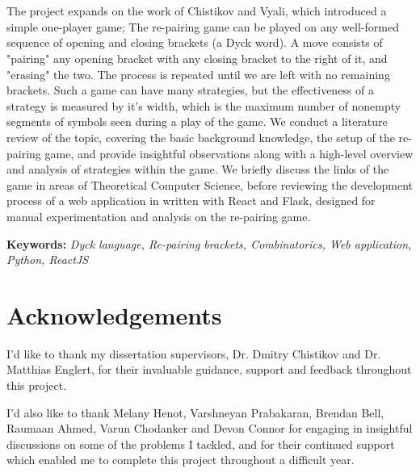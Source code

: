 \clearpage
\thispagestyle{empty}
\nointerlineskip
\vspace*{\fill}
    
\section*{\center \abstractname}
The project expands on the work of Chistikov and Vyali, which introduced a simple one-player game; The re-pairing game can be played on any well-formed sequence of opening and closing brackets (a Dyck word). A move consists of "pairing" any opening bracket with any closing bracket to the right of it, and "erasing" the two. The process is repeated until we are left with no remaining brackets. Such a game can have many strategies, but the effectiveness of a strategy is measured by it's width, which is the maximum number of nonempty segments of symbols seen during a play of the game. We conduct a literature review of the topic, covering the basic background knowledge, the setup of the re-pairing game, and provide insightful observations along with a high-level overview and analysis of strategies within the game. We briefly discuss the links of the game in areas of Theoretical Computer Science, before reviewing the development process of a web application in written with React and Flask, designed for manual experimentation and analysis on the re-pairing game. 

\textbf{Keywords:} \textit{Dyck language, Re-pairing brackets, Combinatorics, Web application, Python, ReactJS}

\section*{\center Acknowledgements}
I'd like to thank my dissertation supervisors, Dr. Dmitry Chistikov and Dr. Matthias Englert, for their invaluable guidance, support and feedback throughout this project. 

I'd also like to thank Melany Henot, Varshneyan Prabakaran, Brendan Bell, Raumaan Ahmed, Varun Chodanker and Devon Connor for engaging in insightful discussions on some of the problems I tackled, and for their continued support which enabled me to complete this project throughout a difficult year.

\vspace*{\fill}